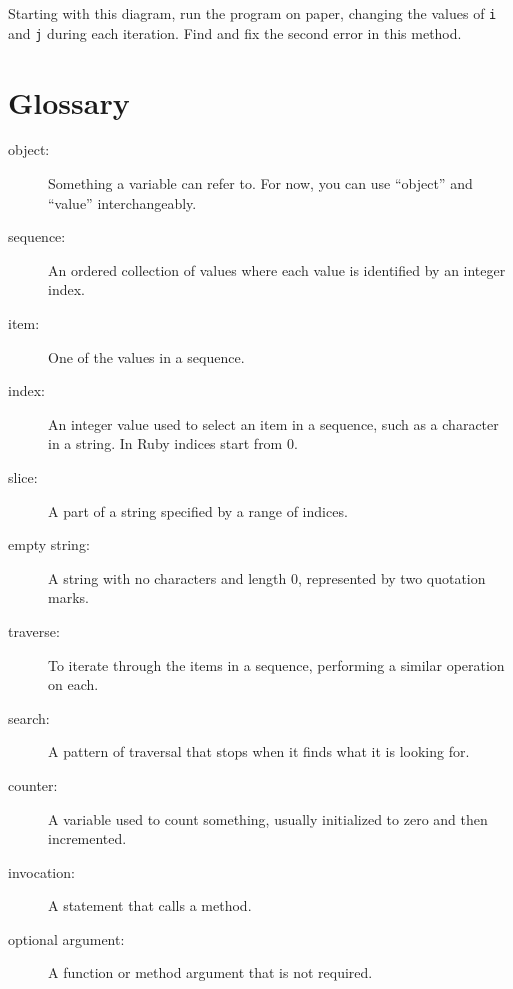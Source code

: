\documentclass[10pt]{book}
\begin{document}
Starting with this diagram, run the program on paper, changing the
values of {\tt i} and {\tt j} during each iteration.  Find and fix the
second error in this method.
\label{reverse?}


\section{Glossary}

\begin{description}

\item[object:] Something a variable can refer to.  For now,
you can use ``object'' and ``value'' interchangeably.

\item[sequence:] An ordered collection of
values where each value is identified by an integer index.

\item[item:] One of the values in a sequence.

\item[index:] An integer value used to select an item in
a sequence, such as a character in a string.  In Ruby
indices start from 0.

\item[slice:] A part of a string specified by a range of indices.

\item[empty string:] A string with no characters and length 0, represented
by two quotation marks.


\item[traverse:] To iterate through the items in a sequence,
performing a similar operation on each.

\item[search:] A pattern of traversal that stops
when it finds what it is looking for.

\item[counter:] A variable used to count something, usually initialized
to zero and then incremented.

\item[invocation:] A statement that calls a method.

\item[optional argument:] A function or method argument that is not
required.

\end{description}
\end{document}
